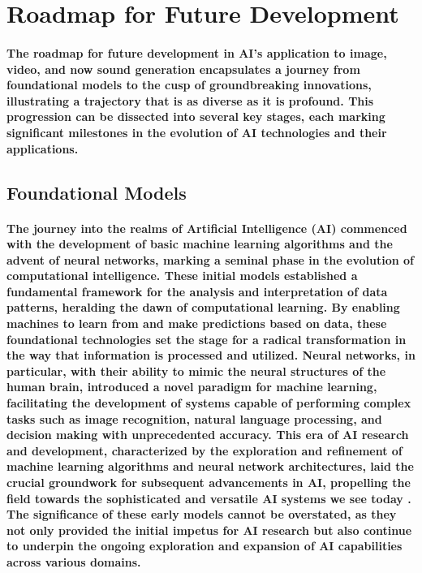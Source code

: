 \documentclass[11pt,a4paper,oneside]{report}
\begin{document}
\section{Roadmap for Future Development}

\paragraph{The roadmap for future development in AI's application to image, video, and now sound generation encapsulates a journey from foundational models to the cusp of groundbreaking innovations, illustrating a trajectory that is as diverse as it is profound. This progression can be dissected into several key stages, each marking significant milestones in the evolution of AI technologies and their applications.}

\subsection{Foundational Models}
\paragraph{The journey into the realms of Artificial Intelligence (AI) commenced with the development of basic machine learning algorithms and the advent of neural networks, marking a seminal phase in the evolution of computational intelligence. These initial models established a fundamental framework for the analysis and interpretation of data patterns, heralding the dawn of computational learning. By enabling machines to learn from and make predictions based on data, these foundational technologies set the stage for a radical transformation in the way that information is processed and utilized. Neural networks, in particular, with their ability to mimic the neural structures of the human brain, introduced a novel paradigm for machine learning, facilitating the development of systems capable of performing complex tasks such as image recognition, natural language processing, and decision making with unprecedented accuracy. This era of AI research and development, characterized by the exploration and refinement of machine learning algorithms and neural network architectures, laid the crucial groundwork for subsequent advancements in AI, propelling the field towards the sophisticated and versatile AI systems we see today \cite{huang2022large}. The significance of these early models cannot be overstated, as they not only provided the initial impetus for AI research but also continue to underpin the ongoing exploration and expansion of AI capabilities across various domains.}
\end{document}
